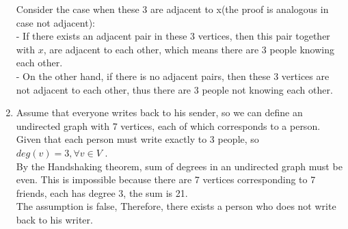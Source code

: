 \documentclass[a4paper]{article}
\begin{document}
\begin{enumerate}
	    Consider the case when these 3 are adjacent to x(the proof is analogous in case not adjacent): \\
	    - If there exists an adjacent pair in these 3 vertices, then this pair together with $x$, are adjacent to each other, which means there are 3 people knowing each other. \\
	    - On the other hand, if there is no adjacent pairs, then these 3 vertices are not adjacent to each other, thus there are 3 people not knowing each other.
	    \item Assume that everyone writes back to his sender, so we can define an undirected graph with 7 vertices, each of which corresponds to a person. Given that each person must write exactly to 3 people, so $deg(v) = 3, \forall v \in V$ . \\
	    By the Handshaking theorem, sum of degrees in an undirected graph must be even. This is impossible because there are 7 vertices corresponding to 7 friends, each has degree 3, the sum is 21. \\
	    The assumption is false, Therefore, there exists a person who does not write back to his writer.
	\end{enumerate}
	
\end{document}
